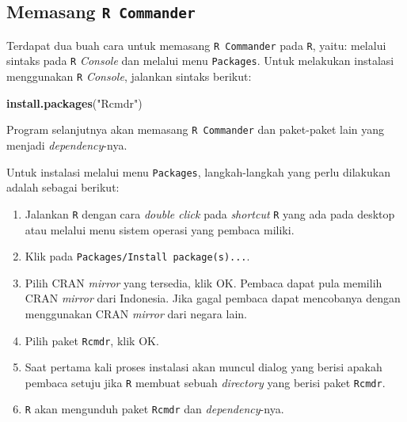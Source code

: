 \documentclass[12pt,]{krantz}
\newenvironment{Shaded}{\begin{snugshade}}{\end{snugshade}}
\newcommand{\KeywordTok}[1]{\textcolor[rgb]{0.13,0.29,0.53}{\textbf{#1}}}
\newcommand{\NormalTok}[1]{#1}
\newcommand{\StringTok}[1]{\textcolor[rgb]{0.31,0.60,0.02}{#1}}
\providecommand{\tightlist}{%
  \setlength{\itemsep}{0pt}\setlength{\parskip}{0pt}}
\begin{document}
\hypertarget{installrcmdr}{%
\subsection{\texorpdfstring{Memasang \texttt{R\ Commander}}{Memasang R Commander}}\label{installrcmdr}}

Terdapat dua buah cara untuk memasang \texttt{R\ Commander} pada \texttt{R}, yaitu: melalui sintaks pada \texttt{R} \emph{Console} dan melalui menu \texttt{Packages}. Untuk melakukan instalasi menggunakan \texttt{R} \emph{Console}, jalankan sintaks berikut:

\begin{Shaded}
\begin{Highlighting}[]
\KeywordTok{install.packages}\NormalTok{(}\StringTok{"Rcmdr"}\NormalTok{)}
\end{Highlighting}
\end{Shaded}

Program selanjutnya akan memasang \texttt{R\ Commander} dan paket-paket lain yang menjadi \emph{dependency}-nya.

Untuk instalasi melalui menu \texttt{Packages}, langkah-langkah yang perlu dilakukan adalah sebagai berikut:

\begin{enumerate}
\def\labelenumi{\arabic{enumi}.}
\tightlist
\item
  Jalankan \texttt{R} dengan cara \emph{double click} pada \emph{shortcut} \texttt{R} yang ada pada desktop atau melalui menu sistem operasi yang pembaca miliki.
\item
  Klik pada \texttt{Packages/Install\ package(s)...}.
\item
  Pilih CRAN \emph{mirror} yang tersedia, klik OK. Pembaca dapat pula memilih CRAN \emph{mirror} dari Indonesia. Jika gagal pembaca dapat mencobanya dengan menggunakan CRAN \emph{mirror} dari negara lain.
\item
  Pilih paket \texttt{Rcmdr}, klik OK.
\item
  Saat pertama kali proses instalasi akan muncul dialog yang berisi apakah pembaca setuju jika \texttt{R} membuat sebuah \emph{directory} yang berisi paket \texttt{Rcmdr}.
\item
  \texttt{R} akan mengunduh paket \texttt{Rcmdr} dan \emph{dependency}-nya.
\end{enumerate}
\end{document}
